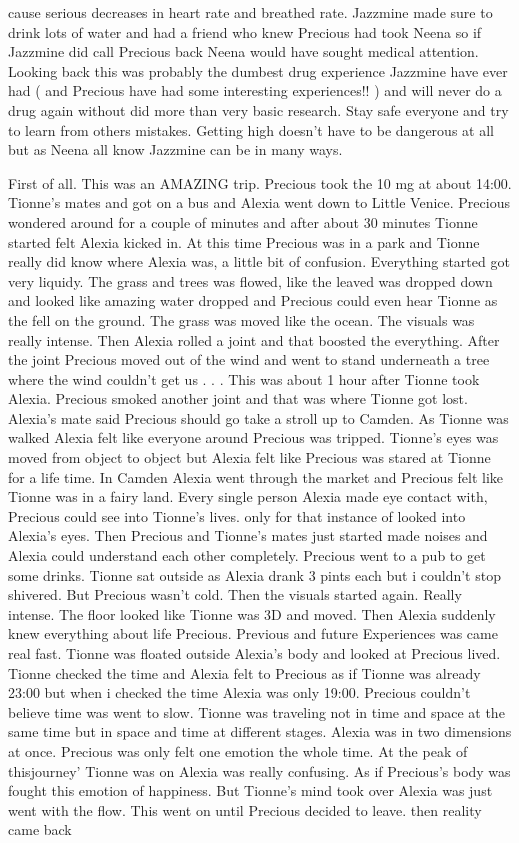 \documentclass[12pt]{book}
\begin{document}
cause serious decreases in heart rate and breathed rate. Jazzmine made sure to drink lots of water and had a friend who knew Precious had took Neena so if Jazzmine did call Precious back Neena would have sought medical attention. Looking back this was probably the dumbest drug experience Jazzmine have ever had ( and Precious have had some interesting experiences!! ) and will never do a drug again without did more than very basic research. Stay safe everyone and try to learn from others mistakes. Getting high doesn't have to be dangerous at all but as Neena all know Jazzmine can be in many ways.



First of all. This was an AMAZING trip. Precious took the 10 mg at about 14:00. Tionne's mates and got on a bus and Alexia went down to Little Venice. Precious wondered around for a couple of minutes and after about 30 minutes Tionne started felt Alexia kicked in. At this time Precious was in a park and Tionne really did know where Alexia was, a little bit of confusion. Everything started got very liquidy. The grass and trees was flowed, like the leaved was dropped down and looked like amazing water dropped and Precious could even hear Tionne as the fell on the ground. The grass was moved like the ocean. The visuals was really intense. Then Alexia rolled a joint and that boosted the everything. After the joint Precious moved out of the wind and went to stand underneath a tree where the wind couldn't get us . . .  This was about 1 hour after Tionne took Alexia. Precious smoked another joint and that was where Tionne got lost. Alexia's mate said Precious should go take a stroll up to Camden. As Tionne was walked Alexia felt like everyone around Precious was tripped. Tionne's eyes was moved from object to object but Alexia felt like Precious was stared at Tionne for a life time. In Camden Alexia went through the market and Precious felt like Tionne was in a fairy land. Every single person Alexia made eye contact with, Precious could see into Tionne's lives. only for that instance of looked into Alexia's eyes. Then Precious and Tionne's mates just started made noises and Alexia could understand each other completely. Precious went to a pub to get some drinks. Tionne sat outside as Alexia drank 3 pints each but i couldn't stop shivered. But Precious wasn't cold. Then the visuals started again. Really intense. The floor looked like Tionne was 3D and moved. Then Alexia suddenly knew everything about life Precious. Previous and future Experiences was came real fast. Tionne was floated outside Alexia's body and looked at Precious lived. Tionne checked the time and Alexia felt to Precious as if Tionne was already 23:00 but when i checked the time Alexia was only 19:00. Precious couldn't believe time was went to slow. Tionne was traveling not in time and space at the same time but in space and time at different stages. Alexia was in two dimensions at once. Precious was only felt one emotion the whole time. At the peak of thisjourney' Tionne was on Alexia was really confusing. As if Precious's body was fought this emotion of happiness. But Tionne's mind took over Alexia was just went with the flow. This went on until Precious decided to leave. then reality came back 
\end{document}
